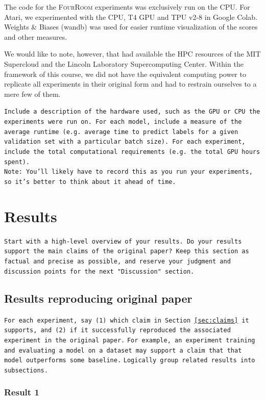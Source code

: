 \documentclass[10pt]{article} %
\begin{document}
\noindent The code for the \textsc{FourRoom} experiments was exclusively run on the CPU. For Atari, we experimented with the CPU, T4 GPU and TPU v2-8 in Google Colab. Weights \& Biases (wandb) was used for easier runtime visualization of the scores and other measures.

\noindent We would like to note, however, that \cite{rle-paper} had available the HPC resources of the MIT Supercloud and the Lincoln Laboratory Supercomputing Center. Within the framework of this course, we did not have the equivalent computing power to replicate all experiments in their original form and had to restrain ourselves to a mere few of them.

\texttt{Include a description of the hardware used, such as the GPU or CPU the experiments were run on. 
For each model, include a measure of the average runtime (e.g. average time to predict labels for a given validation set with a particular batch size).
For each experiment, include the total computational requirements (e.g. the total GPU hours spent).}\\
\texttt{Note: You'll likely have to record this as you run your experiments, so it's better to think about it ahead of time.}

\hypertarget{sec4}{\section{Results}}

\noindent \texttt{Start with a high-level overview of your results. Do your results support the main claims of the original paper? Keep this section as factual and precise as possible, and reserve your judgment and discussion points for the next "Discussion" section.}


\subsection{Results reproducing original paper}
\texttt{For each experiment, say (1) which claim in Section~\ref{sec:claims} it supports, and (2) if it successfully reproduced the associated experiment in the original paper.}
\texttt{For example, an experiment training and evaluating a model on a dataset may support a claim that that model outperforms some baseline.}
\texttt{Logically group related results into subsections.}

\subsubsection{Result 1}
\end{document}
